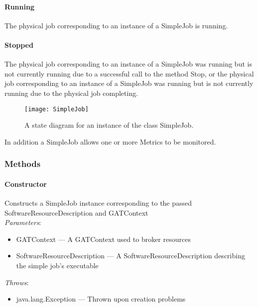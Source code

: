 \documentclass[$Date: 2003/06/26 19:29:31 $]{glabarticle}
\begin{document}
\paragraph{Running} The physical job corresponding to an instance of a SimpleJob is running.

\paragraph{Stopped} The physical job corresponding to an instance of a SimpleJob was running but is 
not currently running due to a successful call to the method Stop, or the physical job corresponding to 
an instance of a SimpleJob was running but is not currently running due to the physical job completing. \\

\begin{figure}[h]    
\begin{center}
\texttt{[image: SimpleJob]}
\end{center}      
\caption{A state diagram for an instance of the class SimpleJob.}
\label{Fig:SimpleJobStateDiagram}
\end{figure}

In addition a SimpleJob allows one or more Metrics to be monitored.


\subsubsection{Methods}

\paragraph{Constructor}

Constructs a SimpleJob instance corresponding to the passed
SoftwareResourceDescription and GATContext\\

\textit{Parameters}:
\begin{itemize}
\item[] GATContext --- A GATContext used to broker resources
\item[] SoftwareResourceDescription --- A SoftwareResourceDescription describing the simple job's executable
\end{itemize}

 \textit{Throws}:
 \begin{itemize}
 \item[] java.lang.Exception --- Thrown upon creation problems 
 \end{itemize}
\end{document}
